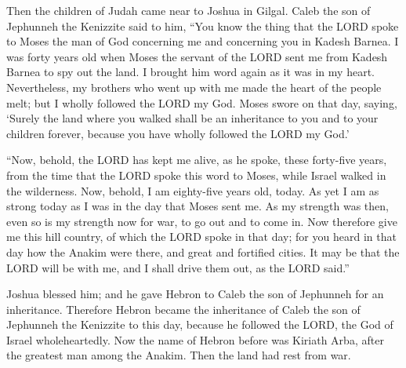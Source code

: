 \myverse{}Then the children of Judah came near to Joshua in Gilgal. Caleb
the son of Jephunneh the Kenizzite said to him, “You know the thing that the LORD spoke to Moses the man
of God concerning me and concerning you in Kadesh Barnea.
\myverse{}I was forty years old when Moses the servant of the LORD sent me from Kadesh
Barnea to spy out the land. I brought him word again as it was in my heart.
\myverse{}Nevertheless, my brothers who went up with me made the heart of the people
melt; but I wholly followed the LORD my God.
\myverse{}Moses swore on that day, saying, ‘Surely the land where you walked shall be
an inheritance to you and to your children forever, because you have wholly followed the LORD my God.’

\myverse{}“Now, behold, the LORD has kept me alive, as he spoke, these
forty-five years, from the time that the LORD spoke this word to Moses, while Israel walked in the wilderness.
Now, behold, I am eighty-five years old, today.
\myverse{}As yet I am as strong today as I was in the day that Moses sent me. As my
strength was then, even so is my strength now for war, to go out and to come in.
\myverse{}Now therefore give me this hill country, of which the LORD spoke in that
day; for you heard in that day how the Anakim were there, and great and fortified cities. It may be that
the LORD will be with me, and I shall drive them out, as the LORD said.”

\myverse{}Joshua blessed him; and he gave Hebron to Caleb the son of Jephunneh
for an inheritance.
\myverse{}Therefore Hebron became the inheritance of Caleb the son of Jephunneh the
Kenizzite to this day, because he followed the LORD, the God of Israel wholeheartedly.
\myverse{}Now the name of Hebron before was Kiriath Arba, after the greatest man among
the Anakim. Then the land had rest from war.


